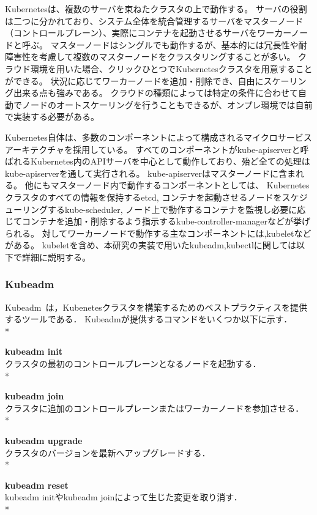 Kubernetesは、複数のサーバを束ねたクラスタの上で動作する。
サーバの役割は二つに分かれており、システム全体を統合管理するサーバをマスターノード（コントロールプレーン）、実際にコンテナを起動させるサーバをワーカーノードと呼ぶ。
マスターノードはシングルでも動作するが、基本的には冗長性や耐障害性を考慮して複数のマスターノードをクラスタリングすることが多い。
クラウド環境を用いた場合、クリックひとつでKubernetesクラスタを用意することができる。
状況に応じてワーカーノードを追加・削除でき、自由にスケーリング出来る点も強みである。
クラウドの種類によっては特定の条件に合わせて自動でノードのオートスケーリングを行うこともできるが、オンプレ環境では自前で実装する必要がある。

Kubernetes自体は、多数のコンポーネントによって構成されるマイクロサービスアーキテクチャを採用している。
すべてのコンポーネントがkube-apiserverと呼ばれるKubernetes内のAPIサーバを中心として動作しており、殆ど全ての処理はkube-apiserverを通して実行される。
kube-apiserverはマスターノードに含まれる。
他にもマスターノード内で動作するコンポーネントとしては、
Kubernetesクラスタのすべての情報を保持するetcd,
コンテナを起動させるノードをスケジューリングするkube-scheduler,
ノード上で動作するコンテナを監視し必要に応じてコンテナを追加・削除するよう指示するkube-controller-managerなどが挙げられる。
対してワーカーノードで動作する主なコンポーネントには,kubeletなどがある。
kubeletを含め、本研究の実装で用いたkubeadm,kubectlに関しては以下で詳細に説明する。


\subsubsection{Kubeadm}

Kubeadm~\cite{Kubeadm}は，Kubenetesクラスタを構築するためのベストプラクティスを提供するツールである．
Kubeadmが提供するコマンドをいくつか以下に示す．\\*

{\bf kubeadm init}\\
クラスタの最初のコントロールプレーンとなるノードを起動する．\\*

{\bf kubeadm join}\\
クラスタに追加のコントロールプレーンまたはワーカーノードを参加させる．\\*

{\bf kubeadm upgrade}\\
クラスタのバージョンを最新へアップグレードする．\\*

{\bf kubeadm reset}\\
kubeadm initやkubeadm joinによって生じた変更を取り消す．\\*

